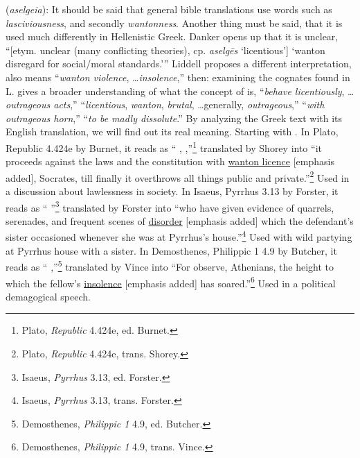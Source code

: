 \item[Brutal (violence),]

(\textit{aselgeia}):
It should be said that general bible translations use words such as \emph{lasciviousness}, and secondly \emph{wantonness}. Another thing must be said, that it is used much differently in Hellenistic Greek. 
Danker opens up that it is unclear, ``[etym. unclear (many conflicting theories), cp. \emph{aselgēs} `licentious'] `wanton disregard for social/moral standards.''' 
Liddell proposes a different interpretation,  also means ``\emph{wanton violence}, \ldots \emph{insolence},'' 
then: examining the cognates found in L. gives a broader understanding of what the concept of  is,
 ``\emph{behave licentiously}, \ldots \emph{outrageous acts},'' 
 ``\emph{licentious}, \emph{wanton}, \emph{brutal}, \ldots generally, \emph{outrageous},''
 ``\emph{with outrageous horn},''
 ``\emph{to be madly dissolute}.''
By analyzing the Greek text with its English translation, we will find out its real meaning. 
Starting with . 
In Plato, Republic 4.424e by Burnet, it reads as `` \underline{}, ,''\footnote{Plato, \emph{Republic} 4.424e, ed. Burnet.}
translated by Shorey into ``it proceeds against the laws and the constitution with \underline{wanton licence} [emphasis added], Socrates, till finally it overthrows all things public and private.''\footnote{Plato, \emph{Republic} 4.424e, trans. Shorey.} Used in a discussion about lawlessness in society. 
In Isaeus, Pyrrhus 3.13 by Forster, it reads as `` \underline{} ''\footnote{Isaeus, \emph{Pyrrhus} 3.13, ed. Forster.}
translated by Forster into ``who have given evidence of quarrels, serenades, and frequent scenes of \underline{disorder} [emphasis added] which the defendant's sister occasioned whenever she was at Pyrrhus's house.''\footnote{Isaeus, \emph{Pyrrhus} 3.13, trans. Forster.} Used with wild partying at Pyrrhus house with a sister. 
In Demosthenes, Philippic 1 4.9 by Butcher, it reads as `` \underline{} ,''\footnote{Demosthenes, \emph{Philippic 1} 4.9, ed. Butcher.}
translated by Vince into ``For observe, Athenians, the height to which the fellow's \underline{insolence} [emphasis added] has soared.''\footnote{Demosthenes, \emph{Philippic 1} 4.9, trans. Vince.} Used in a political demagogical speech. 

